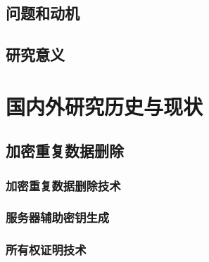 







\subsection{问题和动机}
\subsection{研究意义}

\section{国内外研究历史与现状}

\subsection{加密重复数据删除}
\subsubsection{加密重复数据删除技术}
\subsubsection{服务器辅助密钥生成}
\subsubsection{所有权证明技术}
